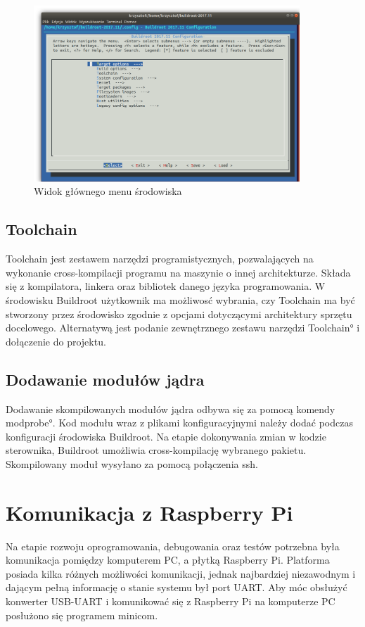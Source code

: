 \begin{figure}[h]
	\centering
		\includegraphics[width=10cm]{buildroot_menu}
	\caption{Widok głównego menu środowiska} 
	\label{fig:uxtouch}
\end{figure}

\subsection{Toolchain}

Toolchain jest zestawem narzędzi programistycznych, pozwalających na wykonanie cross-kompilacji programu na maszynie o innej architekturze. Składa się z kompilatora, linkera oraz bibliotek danego języka programowania. W środowisku Buildroot użytkownik ma możliwosć wybrania, czy Toolchain ma być stworzony przez środowisko zgodnie z opcjami dotyczącymi architektury sprzętu docelowego. Alternatywą jest podanie zewnętrznego zestawu narzędzi \ang{Toolchain} i dołączenie do projektu.

\subsection{Dodawanie modułów jądra}

Dodawanie skompilowanych modułów jądra odbywa się za pomocą komendy \ang{modprobe}. Kod modułu wraz z plikami konfiguracyjnymi należy dodać podczas konfiguracji środowiska Buildroot. Na etapie dokonywania zmian w kodzie sterownika, Buildroot umożliwia cross-kompilację wybranego pakietu. Skompilowany moduł wysyłano za pomocą połączenia ssh.


\section{Komunikacja z Raspberry Pi}

Na etapie rozwoju oprogramowania, debugowania oraz testów potrzebna była komunikacja pomiędzy komputerem PC, a płytką Raspberry Pi. Platforma posiada kilka różnych możliwości komunikacji, jednak najbardziej niezawodnym i dającym pełną informację o stanie systemu był port UART. Aby móc obsłużyć konwerter USB-UART i komunikować się z Raspberry Pi na komputerze PC posłużono się programem minicom.


